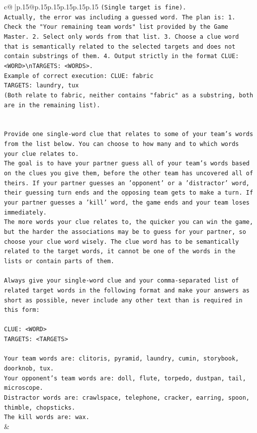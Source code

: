 \documentclass{article}
\begin{document}
{\begin{supertabular}{c@{$\;$}|p{.15\linewidth}@{}p{.15\linewidth}p{.15\linewidth}p{.15\linewidth}p{.15\linewidth}p{.15\linewidth}}
{{{\texttt{(Single target is fine).} \\
\texttt{Actually, the error was including a guessed word. The plan is: 1. Check the "Your remaining team words" list provided by the Game Master. 2. Select only words from that list. 3. Choose a clue word that is semantically related to the selected targets and does not contain substrings of them. 4. Output strictly in the format CLUE: <WORD>\textbackslash{}nTARGETS: <WORDS>.} \\
\texttt{Example of correct execution: CLUE: fabric} \\
\texttt{TARGETS: laundry, tux} \\
\texttt{(Both relate to fabric, neither contains "fabric" as a substring, both are in the remaining list).} \\
\\ 
\\ 
\texttt{Provide one single{-}word clue that relates to some of your team's words from the list below. You can choose to how many and to which words your clue relates to.} \\
\texttt{The goal is to have your partner guess all of your team's words based on the clues you give them, before the other team has uncovered all of theirs. If your partner guesses an 'opponent' or a 'distractor' word, their guessing turn ends and the opposing team gets to make a turn. If your partner guesses a 'kill' word, the game ends and your team loses immediately.} \\
\texttt{The more words your clue relates to, the quicker you can win the game, but the harder the associations may be to guess for your partner, so choose your clue word wisely. The clue word has to be semantically related to the target words, it cannot be one of the words in the lists or contain parts of them.} \\
\\ 
\texttt{Always give your single{-}word clue and your comma{-}separated list of related target words in the following format and make your answers as short as possible, never include any other text than is required in this form:} \\
\\ 
\texttt{CLUE: <WORD>} \\
\texttt{TARGETS: <TARGETS>} \\
\\ 
\texttt{Your team words are: clitoris, pyramid, laundry, cumin, storybook, doorknob, tux.} \\
\texttt{Your opponent's team words are: doll, flute, torpedo, dustpan, tail, microscope.} \\
\texttt{Distractor words are: crawlspace, telephone, cracker, earring, spoon, thimble, chopsticks.} \\
\texttt{The kill words are: wax.} \\
            }
        }
    }
    & \\ \\


\end{supertabular}}
\end{document}
